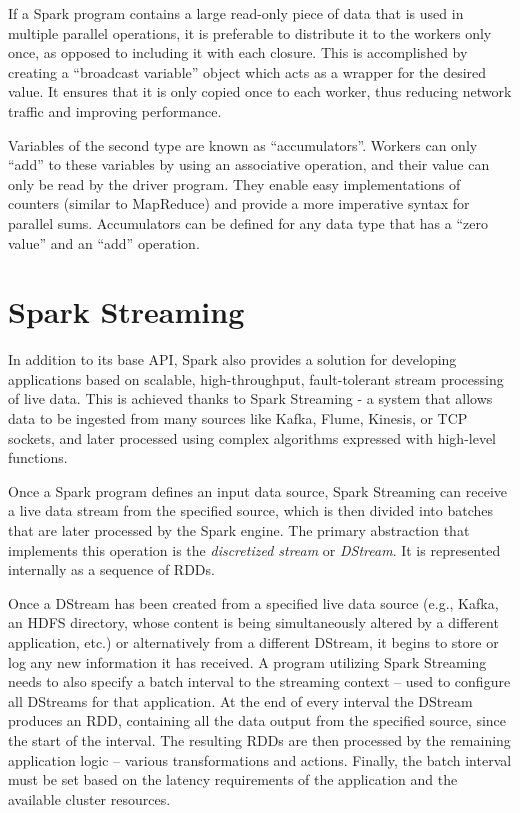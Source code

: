 \documentclass{l4proj}
\begin{document}
If a Spark program contains a large read-only piece of data that is used in multiple parallel operations, it is preferable to distribute it to the workers only once, as opposed to including it with each closure. This is accomplished by creating a ``broadcast variable'' object which acts as a wrapper for the desired value. It ensures that it is only copied once to each worker, thus reducing network traffic and improving performance.

Variables of the second type are known as ``accumulators''. Workers can only ``add'' to these variables by using an associative operation, and their value can only be read by the driver program. They enable easy implementations of counters (similar to MapReduce) and provide a more imperative syntax for parallel sums. Accumulators can be defined for any data type that has a ``zero value'' and an ``add'' operation.

\section{Spark Streaming}

In addition to its base API, Spark also provides a solution for developing applications based on scalable, high-throughput, fault-tolerant stream processing of live data. This is achieved thanks to Spark Streaming - a system that allows data to be ingested from many sources like Kafka, Flume, Kinesis, or TCP sockets, and later processed using complex algorithms expressed with high-level functions.

Once a Spark program defines an input data source, Spark Streaming can receive a live data stream from the specified source, which is then divided into batches that are later processed by the Spark engine. The primary abstraction that implements this operation is the \textit{discretized stream} or \textit{DStream}\cite{DStream}. It is represented internally as a sequence of RDDs.

Once a DStream has been created from a specified live data source (e.g., Kafka, an HDFS directory, whose content is being simultaneously altered by a different application, etc.) or alternatively from a different DStream, it begins to store or log any new information it has received. A program utilizing Spark Streaming needs to also specify a batch interval to the streaming context -- used to configure all DStreams for that application. At the end of every interval the DStream produces an RDD, containing all the data output from the specified source, since the start of the interval. The resulting RDDs are then processed by the remaining application logic -- various transformations and actions. Finally, the batch interval must be set based on the latency requirements of  the application and the available cluster resources.
\end{document}
